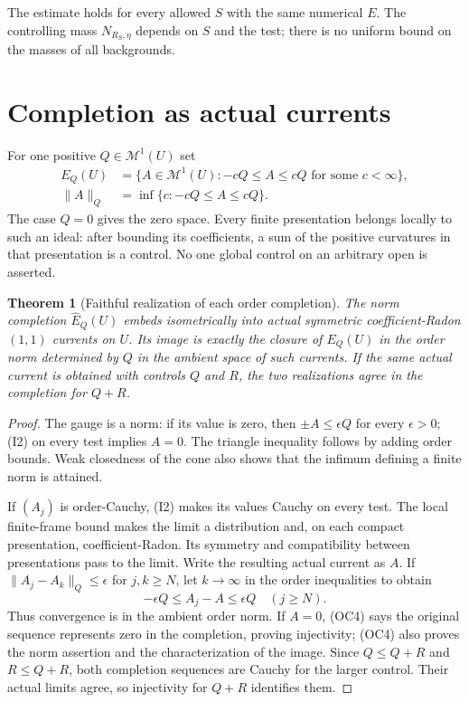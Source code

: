 \documentclass[11pt]{article}
\newtheorem{theorem}{Theorem}
\theoremstyle{remark}\newtheorem{remark}[theorem]{Remark}
\newcommand{\M}{\mathcal M^1}
\begin{document}
The estimate holds for every allowed $S$ with the same numerical $E$.
The controlling mass $N_{R_S,\eta}$ depends on $S$ and the test; there is
no uniform bound on the masses of all backgrounds.

\section{Completion as actual currents}

For one positive $Q\in\M(U)$ set
\[
 \begin{aligned}
 E_Q(U)&=\{A\in\M(U): -cQ\le A\le cQ\text{ for some }c<\infty\},\\
 \|A\|_Q&=\inf\{c:-cQ\le A\le cQ\}.
 \end{aligned}                                         \tag{OC3}
\]
The case $Q=0$ gives the zero space. Every finite presentation belongs
locally to such an ideal: after bounding its coefficients, a sum of the
positive curvatures in that presentation is a control. No one global
control on an arbitrary open is asserted.

\begin{theorem}[Faithful realization of each order completion]\label{thm:completion}
The norm completion $\widehat E_Q(U)$ embeds isometrically into actual
symmetric coefficient-Radon $(1,1)$ currents on $U$. Its image is exactly
the closure of $E_Q(U)$ in the order norm determined by $Q$ in the ambient
space of such currents. If the same actual current is obtained with
controls $Q$ and $R$, the two realizations agree in the completion for
$Q+R$.
\end{theorem}
\begin{proof}
The gauge is a norm: if its value is zero, then $\pm A\le\epsilon Q$
for every $\epsilon>0$; (I2) on every test implies $A=0$.
The triangle inequality follows by adding order bounds. Weak closedness
of the cone also shows that the infimum defining a finite norm is attained.

If $(A_j)$ is order-Cauchy, (I2) makes its values Cauchy on every test.
The local finite-frame bound makes the limit a distribution and, on each
compact presentation, coefficient-Radon. Its symmetry and compatibility
between presentations pass to the limit. Write the resulting actual
current as $A$. If $\|A_j-A_k\|_Q\le\epsilon$ for $j,k\ge N$, let
$k\to\infty$ in the order inequalities to obtain
\[
                -\epsilon Q\le A_j-A\le\epsilon Q
                       \quad(j\ge N).                   \tag{OC4}
\]
Thus convergence is in the ambient order norm. If $A=0$, (OC4) says
the original sequence represents zero in the completion, proving
injectivity; (OC4) also proves the norm assertion and the characterization
of the image. Since $Q\le Q+R$ and $R\le Q+R$, both completion sequences
are Cauchy for the larger control. Their actual limits agree, so
injectivity for $Q+R$ identifies them.
\end{proof}
\end{document}
